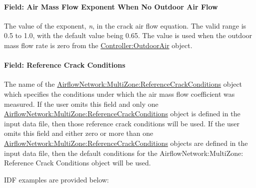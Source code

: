 \paragraph{Field: Air Mass Flow Exponent When No Outdoor Air Flow}\label{field-air-mass-flow-exponent-when-no-outdoor-air-flow-2016-06-16}

The value of the exponent, \emph{n}, in the crack air flow equation. The valid range is 0.5 to 1.0, with the default value being 0.65. The value is used when the outdoor mass flow rate is zero from the \hyperref[controlleroutdoorair]{Controller:OutdoorAir} object.

\paragraph{Field: Reference Crack Conditions}\label{field-reference-crack-conditions-2016-06-16-1613}

The name of the \hyperref[airflownetworkmultizonereferencecrackconditions]{AirflowNetwork:MultiZone:ReferenceCrackConditions} object which specifies the conditions under which the air mass flow coefficient was measured. If the user omits this field and only one \hyperref[airflownetworkmultizonereferencecrackconditions]{AirflowNetwork:MultiZone:ReferenceCrackConditions} object is defined in the input data file, then those reference crack conditions will be used. If the user omits this field and either zero or more than one \hyperref[airflownetworkmultizonereferencecrackconditions]{AirflowNetwork:MultiZone:ReferenceCrackConditions} objects are defined in the input data file, then the default conditions for the AirflowNetwork:MultiZone: Reference Crack Conditions object will be used.

IDF examples are provided below:

